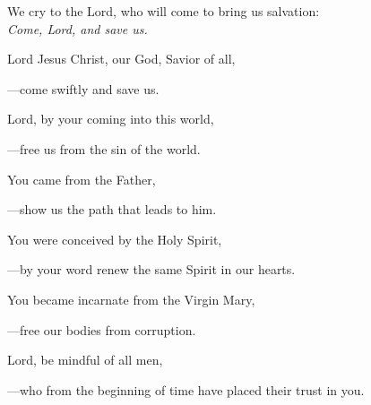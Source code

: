 \intercessions\indent

\begin{hangpar}

We cry to the Lord, who will come to bring us salvation:\\
\emph{Come, Lord, and save us.}

\medskip Lord Jesus Christ, our God, Savior of all,

{\color{red}---\thinspace}come swiftly and save us.

\medskip Lord, by your coming into this world,

{\color{red}---\thinspace}free us from the sin of the world.

\medskip You came from the Father,

{\color{red}---\thinspace}show us the path that leads to him.

\medskip You were conceived by the Holy Spirit,

{\color{red}---\thinspace}by your word renew the same Spirit in our hearts.

\medskip You became incarnate from the Virgin Mary,

{\color{red}---\thinspace}free our bodies from corruption.

\medskip Lord, be mindful of all men,

{\color{red}---\thinspace}who from the beginning of time have placed their trust in you.

\end{hangpar}
